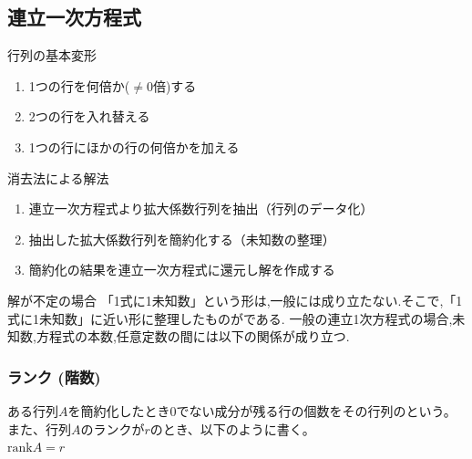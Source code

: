 \documentclass[a4paper]{jsarticle}
\begin{document}
\subsection{連立一次方程式}
\begin{itembox}[l]{行列の基本変形}
    \begin{enumerate}[(1)]
        \item 1つの行を何倍か($\neq0$倍)する
        \item 2つの行を入れ替える
        \item 1つの行にほかの行の何倍かを加える
    \end{enumerate}
\end{itembox}
\begin{itembox}[l]{消去法による解法}
    \begin{enumerate}[(1)]
        \item 連立一次方程式より拡大係数行列を抽出（行列のデータ化）
        \item 抽出した拡大係数行列を簡約化する（未知数の整理）
        \item 簡約化の結果を連立一次方程式に還元し解を作成する
    \end{enumerate}
\end{itembox}
\begin{itembox}[l]{解が不定の場合}
    「1式に1未知数」という形は,一般には成り立たない.そこで,「1式に1未知数」に近い形に整理したものがである.
    一般の連立1次方程式の場合,未知数,方程式の本数,任意定数の間には以下の関係が成り立つ.
    \begin{center}
    \end{center}
\end{itembox}
\subsubsection{ランク (階数)}
\begin{itembox}[l]{}
    \begin{center}
        ある行列$A$を簡約化したとき$0$でない成分が残る行の個数をその行列のという。\\
        また、行列$A$のランクが$r$のとき、以下のように書く。\\
        $\mathrm{rank}A=r$\\
    \end{center}
\end{itembox}
\end{document}
